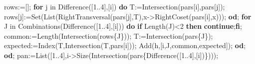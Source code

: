 \documentclass[
  10pt,
  letterpaper,
]{article}
\newenvironment{Shaded}{}{}
\newcommand{\BuiltInTok}[1]{\textcolor[rgb]{0.00,0.50,0.00}{#1}}
\newcommand{\ControlFlowTok}[1]{\textcolor[rgb]{0.00,0.44,0.13}{\textbf{#1}}}
\newcommand{\ExtensionTok}[1]{#1}
\newcommand{\FloatTok}[1]{\textcolor[rgb]{0.25,0.63,0.44}{#1}}
\newcommand{\NormalTok}[1]{#1}
\newcommand{\OperatorTok}[1]{\textcolor[rgb]{0.40,0.40,0.40}{#1}}
\newcommand{\VariableTok}[1]{\textcolor[rgb]{0.10,0.09,0.49}{#1}}
\begin{document}
\begin{Shaded}
\begin{Highlighting}[]
  \VariableTok{rows}\OperatorTok{:=}\NormalTok{[]}\OperatorTok{;}
  \ControlFlowTok{for} \VariableTok{j} \ExtensionTok{in} \BuiltInTok{Difference}\NormalTok{([}\FloatTok{1}\OperatorTok{..}\FloatTok{4}\NormalTok{]}\OperatorTok{,}\NormalTok{[}\VariableTok{i}\NormalTok{]) }\ControlFlowTok{do}
   \VariableTok{T}\OperatorTok{:=}\BuiltInTok{Intersection}\NormalTok{(}\VariableTok{pars}\NormalTok{[}\VariableTok{i}\NormalTok{]}\OperatorTok{,}\VariableTok{pars}\NormalTok{[}\VariableTok{j}\NormalTok{])}\OperatorTok{;}
   \VariableTok{rows}\NormalTok{[}\VariableTok{j}\NormalTok{]}\OperatorTok{:=}\BuiltInTok{Set}\NormalTok{(}\BuiltInTok{List}\NormalTok{(}\BuiltInTok{RightTransversal}\NormalTok{(}\VariableTok{pars}\NormalTok{[}\VariableTok{j}\NormalTok{]}\OperatorTok{,}\VariableTok{T}\NormalTok{)}\OperatorTok{,}\VariableTok{x}\OperatorTok{{-}\textgreater{}}\BuiltInTok{RightCoset}\NormalTok{(}\VariableTok{pars}\NormalTok{[}\VariableTok{i}\NormalTok{]}\OperatorTok{,}\VariableTok{x}\NormalTok{)))}\OperatorTok{;}
  \ControlFlowTok{od}\OperatorTok{;}
  \ControlFlowTok{for} \VariableTok{J} \ExtensionTok{in} \BuiltInTok{Combinations}\NormalTok{(}\BuiltInTok{Difference}\NormalTok{([}\FloatTok{1}\OperatorTok{..}\FloatTok{4}\NormalTok{]}\OperatorTok{,}\NormalTok{[}\VariableTok{i}\NormalTok{])) }\ControlFlowTok{do}
   \ControlFlowTok{if} \BuiltInTok{Length}\NormalTok{(}\VariableTok{J}\NormalTok{)}\OperatorTok{\textless{}}\FloatTok{2} \ControlFlowTok{then} \ControlFlowTok{continue}\OperatorTok{;}\ControlFlowTok{fi}\OperatorTok{;}
   \VariableTok{common}\OperatorTok{:=}\BuiltInTok{Length}\NormalTok{(}\BuiltInTok{Intersection}\NormalTok{(}\VariableTok{rows}\NormalTok{\{}\VariableTok{J}\NormalTok{\}))}\OperatorTok{;} \VariableTok{T}\OperatorTok{:=}\BuiltInTok{Intersection}\NormalTok{(}\VariableTok{pars}\NormalTok{\{}\VariableTok{J}\NormalTok{\})}\OperatorTok{;}
   \VariableTok{expected}\OperatorTok{:=}\BuiltInTok{Index}\NormalTok{(}\VariableTok{T}\OperatorTok{,}\BuiltInTok{Intersection}\NormalTok{(}\VariableTok{T}\OperatorTok{,}\VariableTok{pars}\NormalTok{[}\VariableTok{i}\NormalTok{]))}\OperatorTok{;}
   \BuiltInTok{Add}\NormalTok{(}\VariableTok{h}\OperatorTok{,}\NormalTok{[}\VariableTok{i}\OperatorTok{,}\VariableTok{J}\OperatorTok{,}\VariableTok{common}\OperatorTok{,}\VariableTok{expected}\NormalTok{])}\OperatorTok{;}
  \ControlFlowTok{od}\OperatorTok{;}
 \ControlFlowTok{od}\OperatorTok{;}
 \VariableTok{pan}\OperatorTok{:=}\BuiltInTok{List}\NormalTok{([}\FloatTok{1}\OperatorTok{..}\FloatTok{4}\NormalTok{]}\OperatorTok{,}\VariableTok{i}\OperatorTok{{-}\textgreater{}}\BuiltInTok{Size}\NormalTok{(}\BuiltInTok{Intersection}\NormalTok{(}\VariableTok{pars}\NormalTok{\{}\BuiltInTok{Difference}\NormalTok{([}\FloatTok{1}\OperatorTok{..}\FloatTok{4}\NormalTok{]}\OperatorTok{,}\NormalTok{[}\VariableTok{i}\NormalTok{])\})))}\OperatorTok{;}

\end{Highlighting}
\end{Shaded}
\end{document}
